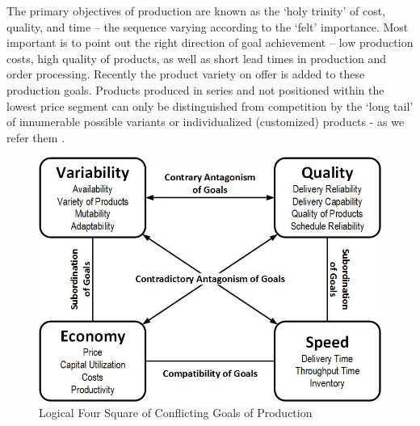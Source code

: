 The primary objectives of production are known as the ‘holy trinity’ of cost,
quality, and time – the sequence varying according to the ‘felt’ importance. Most
important is to point out the right direction of goal achievement – low production
costs, high quality of products, as well as short lead times in production and order
processing. Recently the product variety on offer is added to these production goals. Products produced in series and not positioned within the lowest price segment
can only be distinguished from competition by the ‘long tail’ of innumerable possible
variants or individualized (customized) products - as we refer them \cite{LEANFAC}.
\begin{figure}[h!]
	\includegraphics[scale=0.49]{./gfx/4goals}
	\centering
	\caption{Logical Four Square of Conflicting Goals of Production \cite{LEANFAC}}
	\label{fig:1.2}
\end{figure}

